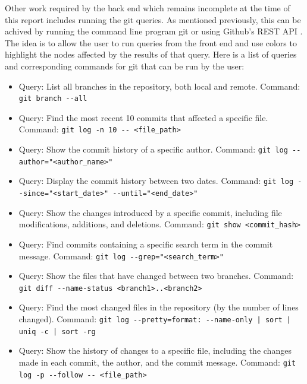 Other work required by the back end which remains incomplete at the time of this report includes running the git queries. As mentioned previously, this can be achived by running the command line program git or using Github's REST API \cite{gitrestapi}. The idea is to allow the user to run queries from the front end and use colors to highlight the nodes affected by the results of that query. Here is a list of queries and corresponding commands for git that can be run by the user:
\begin{itemize}
    \item Query: List all branches in the repository, both local and remote.
    Command: \lstinline{git branch --all}

    \item Query: Find the most recent 10 commits that affected a specific file.
    Command: \lstinline{git log -n 10 -- <file_path>}

    \item Query: Show the commit history of a specific author.
    Command: \lstinline{git log --author="<author_name>"}
    
    \item Query: Display the commit history between two dates.
    Command: \lstinline{git log --since="<start_date>" --until="<end_date>"}
    
    \item Query: Show the changes introduced by a specific commit, including file modifications, additions, and deletions.
    Command: \lstinline{git show <commit_hash>}

    \item Query: Find commits containing a specific search term in the commit message.
    Command: \lstinline{git log --grep="<search_term>"}

    \item Query: Show the files that have changed between two branches.
    Command: \lstinline{git diff --name-status <branch1>..<branch2>}

    \item Query: Find the most changed files in the repository (by the number of lines changed).
    Command: \lstinline{git log --pretty=format: --name-only | sort | uniq -c | sort -rg}

    \item Query: Show the history of changes to a specific file, including the changes made in each commit, the author, and the commit message.
    Command: \lstinline{git log -p --follow -- <file_path>}

\end{itemize}
